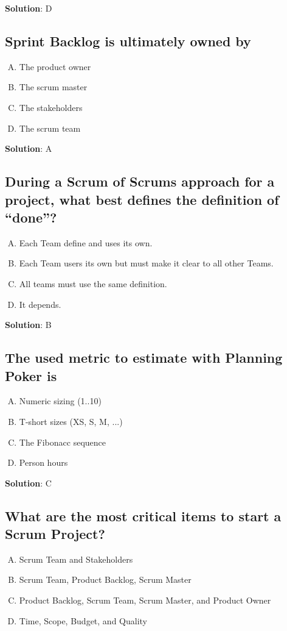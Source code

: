 \textbf{Solution}: D


\subsection{Sprint Backlog is ultimately owned by}
\begin{enumerate}[A)]
  \item The product owner
  \item The scrum master
  \item The stakeholders
  \item The scrum team
\end{enumerate}


\textbf{Solution}: A


\subsection{During a Scrum of Scrums approach for a project, what best defines the definition of \enquote{done}?}
\begin{enumerate}[A)]
  \item Each Team define and uses its own.
  \item Each Team users its own but must make it clear to all other Teams.
  \item All teams must use the same definition.
  \item It depends.
\end{enumerate}


\textbf{Solution}: B


\subsection{The used metric to estimate with Planning Poker is}
\begin{enumerate}[A)]
  \item Numeric sizing (1..10)
  \item T-short sizes (XS, S, M, ...)
  \item The Fibonacc sequence
  \item Person hours
\end{enumerate}


\textbf{Solution}: C


\subsection{What are the most critical items to start a Scrum Project?}
\begin{enumerate}[A)]
  \item Scrum Team and Stakeholders
  \item Scrum Team, Product Backlog, Scrum Master
  \item Product Backlog, Scrum Team, Scrum Master, and Product Owner
  \item Time, Scope, Budget, and Quality
\end{enumerate}


